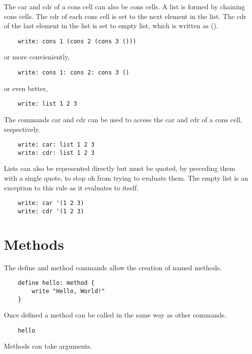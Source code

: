 \documentclass[12pt]{book}
\begin{document}
The car and cdr of a cons cell can also be cons cells. A list is formed
by chaining cons cells. The cdr of each cons cell is set to the next
element in the list. The cdr of the last element in the list is set to
empty list, which is written as ().

\begin{lstlisting}
	write: cons 1 (cons 2 (cons 3 ()))
\end{lstlisting}

or more convieniently,

\begin{lstlisting}
	write: cons 1: cons 2: cons 3 ()
\end{lstlisting}

or even better,

\begin{lstlisting}
	write: list 1 2 3
\end{lstlisting}

The commands car and cdr can be used to access the car and cdr of a
cons cell, respectively.

\begin{lstlisting}
	write: car: list 1 2 3
	write: cdr: list 1 2 3
\end{lstlisting}

Lists can also be represented directly but must be quoted, by preceding
them with a single quote, to stop oh from trying to evaluate them. The
empty list is an exception to this rule as it evaluates to itself.

\begin{lstlisting}
	write: car '(1 2 3)
	write: cdr '(1 2 3)
\end{lstlisting}


\section{Methods}

The define and method commands allow the creation of named methods.

\begin{lstlisting}
	define hello: method {
		write "Hello, World!"
	}
\end{lstlisting}

Once defined a method can be called in the same way as other commands.

\begin{lstlisting}
	hello
\end{lstlisting}

Methods can take arguments.
\end{document}
